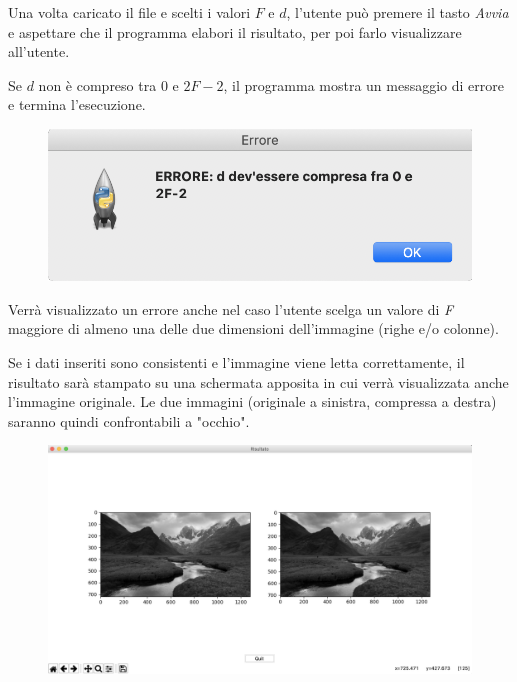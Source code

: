\documentclass[preprint,12pt]{elsarticle}
\begin{document}
	Una volta caricato il file e scelti i valori $F$ e $d$, l'utente può premere il tasto \textit{Avvia} e aspettare che il programma elabori il risultato, per poi farlo visualizzare all'utente.
	
	Se $d$ non è compreso tra $0$ e $2F-2$, il programma mostra un messaggio di errore e termina l'esecuzione.
	\begin{figure}[H]
		\centering
		\includegraphics[width=0.55\linewidth]{errore}
	\end{figure}

	Verrà visualizzato un errore anche nel caso l'utente scelga un valore di \textit{F} maggiore di almeno una delle due dimensioni dell'immagine (righe e/o colonne).
	
	Se i dati inseriti sono consistenti e l'immagine viene letta correttamente, il risultato sarà stampato su una schermata apposita in cui verrà visualizzata anche l'immagine originale.
	Le due immagini (originale a sinistra, compressa a destra) saranno quindi confrontabili a "occhio".
		
		
		
		\begin{figure}[H]
			\centering
			\includegraphics[width=1\linewidth]{risultato}
		\end{figure}
		
		

	
\end{document}
